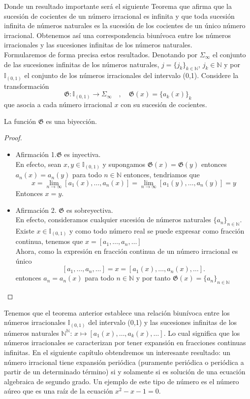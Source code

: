 Donde un resultado importante será el siguiente Teorema que afirma que la sucesión de cocientes de un número irracional es infinita y que toda sucesión infinita de números naturales es la sucesión de los cocientes de un único número irracional. Obtenemos así una correspondencia biunívoca entre los números irracionales y las sucesiones infinitas de los números naturales.
\\

Formularemos de forma precisa estos resultados. Denotando por $\Sigma_{\infty}$ el conjunto de las sucesiones infinitas de los números naturales, $j=\{j_{k}\}_{k\in\mathbb{N}}$, $j_{k}\in\mathbb{N}$ y por $\mathbb{I}_{(0,1)}$ el conjunto de los números irracionales del intervalo (0,1). Considere la transformación
$$
\mathfrak{G}:\mathbb{I}_{(0,1)}\longrightarrow\Sigma_{\infty} \quad,\quad \mathfrak{G}(x)=\{a_{k}(x)\}_{k}
$$
que asocia a cada número irracional $x$ con su sucesión de cocientes.

\begin{teo}
La función $\mathfrak{G}$ es una biyección.
\label{teo3-1}
\end{teo}

\begin{proof}\hfill
\begin{itemize}
    \item[]Afirmación 1.$\mathfrak{G}$ es inyectiva. \\
    En efecto, sean $x,y\in\mathbb{I}_{(0,1)}$ y supongamos $\mathfrak{G}(x)=\mathfrak{G}(y)$ entonces  $a_{n}(x)=a_{n}(y)$ para todo $n\in\mathbb{N}$ entonces, tendriamos que $$
    x=\displaystyle\lim_{n\to\infty}[a_{1}(x),\ldots,a_{n}(x)]=\displaystyle\lim_{n\to\infty}[a_{1}(y),\ldots,a_{n}(y)]=y
    $$
    Entonces $x=y$.
    \item[]Afirmación 2. $\mathfrak{G}$ es sobreyectiva.
    \\
    En efecto, consideramos cualquier sucesión de números naturales $\{a_{n}\}_{n\in\mathbb{N}}$. Existe $x\in\mathbb{I}_{(0,1)}$ y como todo número real se puede expresar como fracción continua, tenemos que $x=[a_{1},\ldots,a_{n},\ldots]$\\
    Ahora, como la expresión en fracción continua de un número irracional es único $$[a_{1},\ldots,a_{n},\ldots]=x=[a_{1}(x),\ldots,a_{n}(x),\ldots].$$
    entonces $a_{n}=a_{n}(x)$ para todo $n\in\mathbb{N}$  y por tanto $\mathfrak{G}(x)=\{a_{n}\}_{n\in\mathbb{N}}$
\end{itemize} 
\end{proof}

Tenemos que el teorema anterior establece una relación biunívoca entre los números irracionales $\mathbb{I}_{(0,1)}$ del intervalo (0,1) y las sucesiones infinitas de los números naturales $\mathbb{N}^{\mathbb{N}}$: $x\mapsto[a_{1}(x),\ldots,a_{k}(x),\ldots]$. Lo cual significa que los números irracionales se caracterizan por tener expansión en fracciones continuas infinitas. En el siguiente capítulo obtendremos un interesante resultado: un número irracional tiene expansión periódica (puramente periódica o periódica a partir de un determinado término) si y solamente si es solución de una ecuación algebraica de segundo grado. Un ejemplo de este tipo de número es el número aúreo que es una raíz de la ecuación $x^{2}-x-1=0$.
\newpage
